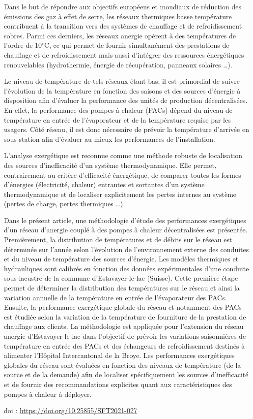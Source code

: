 {\normalsize
Dans le but de répondre aux objectifs européens et mondiaux de réduction des émissions des gaz à effet de serre, les réseaux thermiques basse température contribuent à la transition vers des systèmes de chauffage et de refroidissement sobres. Parmi ces derniers, les réseaux anergie opèrent à des températures de l'ordre de 10$^{\circ}$C, ce qui permet de fournir simultanément des prestations de chauffage et de refroidissement mais aussi d'intégrer des ressources énergétiques renouvelables (hydrothermie, énergie de récupération, panneaux solaires …). 



Le niveau de température de tels réseaux étant bas, il est primordial de suivre l'évolution de la température en fonction des saisons et des sources d'énergie à disposition afin d'évaluer la performance des unités de production décentralisées. En effet, la performance des pompes à chaleur (PACs) dépend du niveau de température en entrée de l'évaporateur et de la température requise par les usagers. Côté réseau, il est donc nécessaire de prévoir la température d'arrivée en sous-station afin d'évaluer au mieux les performances de l'installation.



L'analyse exergétique est reconnue comme une méthode robuste de localisation des sources d'inefficacité d'un système thermodynamique. Elle permet, contrairement au critère d'efficacité énergétique, de comparer toutes les formes d'énergies (électricité, chaleur) entrantes et sortantes d'un système thermodynamique et de localiser explicitement les pertes internes au système (pertes de charge, pertes thermiques …). 



Dans le présent article, une méthodologie d'étude des performances exergétiques d'un réseau d'anergie couplé à des pompes à chaleur décentralisées est présentée. Premièrement, la distribution de températures et de débits sur le réseau est déterminée sur l'année selon l'évolution de l'environnement externe des conduites et du niveau de température des sources d'énergie. Les modèles thermiques et hydrauliques sont calibrés en fonction des données expérimentales d'une conduite sous-lacustre de la commune d'Estavayer-le-lac (Suisse). Cette première étape permet de déterminer la distribution des températures sur le réseau et ainsi la variation annuelle de la température en entrée de l'évaporateur des PACs. Ensuite, la performance exergétique globale du réseau et notamment des PACs est étudiée selon la variation de la température de fourniture de la prestation de chauffage aux clients. La méthodologie est appliquée pour l'extension du réseau anergie d'Estavayer-le-lac dans l'objectif de prévoir les variations saisonnières de température en entrée des PACs et des échangeurs de refroidissement destinés à alimenter l'Hôpital Intercantonal de la Broye. Les performances exergétiques globales du réseau sont évaluées en fonction des niveaux de température (de la source et de la demande) afin de localiser spécifiquement les sources d'inefficacité et de fournir des recommandations explicites quant aux caractéristiques des pompes à chaleur à déployer.

 \vfill doi : \url{https://doi.org/10.25855/SFT2021-027}

}
 
